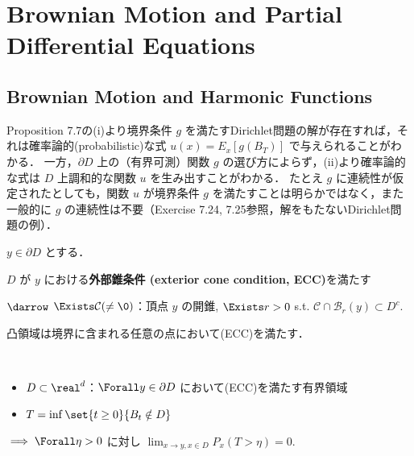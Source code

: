 \documentclass{jsarticle}
\title{}
\author{}
\date{
}
\begin{document}
\setcounter{section}{6}
\section{Brownian Motion and Partial Differential Equations}
\setcounter{subsection}{1}
\subsection{Brownian Motion and Harmonic Functions}

Proposition 7.7の(i)より境界条件 $g$ を満たすDirichlet問題の解が存在すれば，それは確率論的(probabilistic)な式 $u(x)=E_x[g(B_T)]$ で与えられることがわかる．
一方，$\partial D$ 上の（有界可測）関数 $g$ の選び方によらず，(ii)より確率論的な式は $D$ 上調和的な関数 $u$ を生み出すことがわかる．
たとえ $g$ に連続性が仮定されたとしても，関数 $u$ が境界条件 $g$ を満たすことは明らかではなく，また一般的に $g$ の連続性は不要（Exercise 7.24, 7.25参照，解をもたないDirichlet問題の例）．

\begin{shadebox}
    \begin{df*}
        $y\in\partial D$ とする．
        
        $D$ が $y$ における\textbf{外部錐条件 (exterior cone condition, ECC)}を満たす
        
        $\darrow$
        $\Exists \mathcal{C}(\neq\0)$：頂点 $y$ の開錐, $\Exists r>0$ s.t. $\mathcal{C}\cap \mathcal{B}_r(y)\subset D^c.$
    \end{df*}
\end{shadebox}

\begin{ex*}
    凸領域は境界に含まれる任意の点において(ECC)を満たす．
\end{ex*}


\setcounter{thm}{8}
\begin{shadebox}
    \begin{lem}\label{thm:709}~
        \begin{itemize}
            \item $D\subset \real^d$：$\Forall y\in\partial D$ において(ECC)を満たす有界領域
            \item $T=\inf\set{t\ge0}{B_t\notin D}$
        \end{itemize}
    
        $\implies \Forall \eta>0$ に対し $\lim_{x\to y, x\in D}P_x(T>\eta) = 0.$
    \end{lem}
\end{shadebox}
\end{document}
